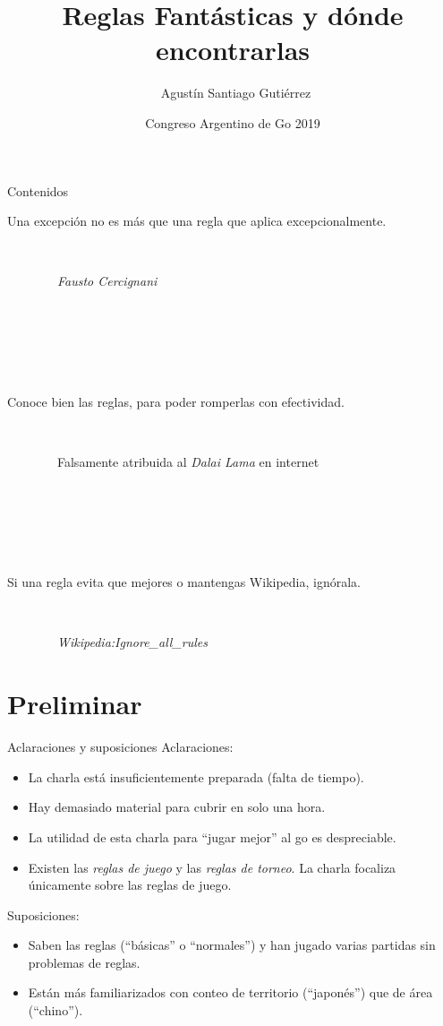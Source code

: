 \documentclass{beamer}
\title %
{Reglas Fantásticas y dónde encontrarlas}
\author[Agustín Gutiérrez] %
{~Agustín Santiago Gutiérrez}
\institute[AAGO] %
{
  Asociación Argentina de GO
}
\date[Congreso 2019] %
{Congreso Argentino de Go 2019}
\begin{document}
\begin{frame}
  \titlepage
\end{frame}

\begin{frame}{Contenidos}
  \footnotesize
  \tableofcontents
\end{frame}

\begin{frame}
  Una excepción no es más que una regla que aplica excepcionalmente.
  
  
  \ 
  
  \hfill \ \ \ \ \ \ \ \ \textit{Fausto Cercignani}

  \ 
  
  \ 
  
  \  
  
  Conoce bien las reglas, para poder romperlas con efectividad.
  
  \ 
  
  \hfill \ \ \ \ \ \ \ \ Falsamente atribuida al \textit{Dalai Lama} en internet
  
  \ 
  
  \ 
  
  \ 

  Si una regla evita que mejores o mantengas Wikipedia, ignórala.

  \ 
  
  \hfill \ \ \ \ \ \ \ \ \textit{Wikipedia:Ignore\_all\_rules}
\end{frame}


\section{Preliminar}

\begin{frame}{Aclaraciones y suposiciones}
  Aclaraciones:
  
  \begin{itemize}
  
  \item La charla está insuficientemente preparada (falta de tiempo).
  \item Hay demasiado material para cubrir en solo una hora.
  \item La utilidad de esta charla para ``jugar mejor'' al go es despreciable.
  \item Existen las \textit{reglas de juego} y las \textit{reglas de torneo}. La charla focaliza únicamente sobre las reglas de juego.
  \end{itemize}
  
  Suposiciones:
  
  \begin{itemize}
  \item Saben las reglas (``básicas'' o ``normales'') y han jugado varias partidas sin problemas de reglas.
  \item Están más familiarizados con conteo de territorio (``japonés'') que de área (``chino'').
  \end{itemize}
  
  
\end{frame}
\end{document}
